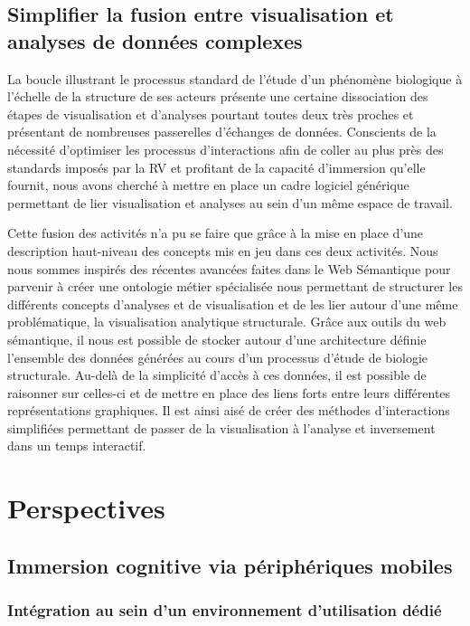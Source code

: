 \subsection*{Simplifier la fusion entre visualisation et analyses de données complexes}

La boucle illustrant le processus standard de l'étude d'un phénomène biologique à l'échelle de la structure de ses acteurs présente une certaine dissociation des étapes de visualisation et d'analyses pourtant toutes deux très proches et présentant de nombreuses passerelles d'échanges de données. Conscients de la nécessité d'optimiser les processus d'interactions afin de coller au plus près des standards imposés par la RV et profitant de la capacité d'immersion qu'elle fournit, nous avons cherché à mettre en place un cadre logiciel générique permettant de lier visualisation et analyses au sein d'un même espace de travail.

Cette fusion des activités n'a pu se faire que grâce à la mise en place d'une description haut-niveau des concepts mis en jeu dans ces deux activités. Nous nous sommes inspirés des récentes avancées faites dans le Web Sémantique pour parvenir à créer une ontologie métier spécialisée nous permettant de structurer les différents concepts d'analyses et de visualisation et de les lier autour d'une même problématique, la visualisation analytique structurale. 
Grâce aux outils du web sémantique, il nous est possible de stocker autour d'une architecture définie l'ensemble des données générées au cours d'un processus d'étude de biologie structurale. Au-delà de la simplicité d'accès à ces données, il est possible de raisonner sur celles-ci et de mettre en place des liens forts entre leurs différentes représentations graphiques. Il est ainsi aisé de créer des méthodes d'interactions simplifiées permettant de passer de la visualisation à l'analyse et inversement dans un temps interactif.


\section*{Perspectives}

\subsection{Immersion cognitive via périphériques mobiles}

\subsubsection*{Intégration au sein d'un environnement d'utilisation dédié}

